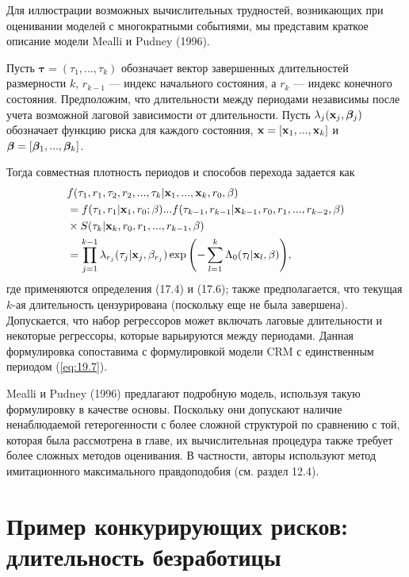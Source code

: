 \noindent
Для иллюстрации возможных вычислительных трудностей, возникающих при оценивании моделей с многократными событиями, мы представим краткое описание модели Mealli и Pudney (1996).

Пусть $\bm{\tau} = (\tau_1, ..., \tau_k)$ обозначает вектор завершенных длительностей размерности $k$, $r_{k-1}$ --- индекс начального состояния, а $r_k$ --- индекс конечного состояния. Предположим, что длительности между периодами независимы после учета возможной лаговой зависимости от длительности. Пусть $\lambda_j(\mathbf{x}_j, \bm{\beta}_j)$ обозначает функцию риска для каждого состояния, $\mathbf{x} = [\mathbf{x}_1, ..., \mathbf{x}_k]$ и $\bm{\beta} = [\bm{\beta}_1, ..., \bm{\beta}_k]$.

Тогда совместная плотность периодов и способов перехода задается как
        \begin{align}\label{eq:19.26}
        &f(\tau_1, r_1, \tau_2, r_2,..., \tau_k|\mathbf{x}_1,..., \mathbf{x}_k,r_0,\beta) \\
        &= f(\tau_1, r_1|\mathbf{x}_1,r_0;\beta)...f(\tau_{k-1},r_{k-1}|\mathbf{x}_{k-1}, r_0, r_1,..., r_{k-2},\beta) \notag \\
        &\times S(\tau_k|\mathbf{x}_k,r_0,r_1,..., r_{k-1}, \beta) \notag \\
        &= \prod^{k-1}_{j=1} \lambda_{r_j}(\tau_j|\mathbf{x}_j,\beta_{r_j}) \exp{\left(-\sum^{k}_{l=1} \Lambda_0(\tau_l|\mathbf{x}_l,\beta) \right)}, \notag
        \end{align}
где применяются определения (17.4) %
и (17.6); %
также предполагается, что текущая $k$-ая длительность цензурирована (поскольку еще не была завершена).
Допускается, что набор регрессоров может включать лаговые длительности и некоторые регрессоры, которые варьируются между периодами. Данная формулировка сопоставима с формулировкой модели CRM с единственным периодом (\ref{eq:19.7}).

Mealli и Pudney (1996) предлагают подробную модель, используя такую формулировку в качестве основы. Поскольку они допускают наличие ненаблюдаемой гетерогенности с более сложной структурой по сравнению с той, которая была рассмотрена в главе, их вычислительная процедура также требует более сложных методов оценивания. В частности, авторы используют метод имитационного максимального правдоподобия (см. раздел 12.4). %




\section{Пример конкурирующих рисков: длительность безработицы}\label{sec:19.5}

